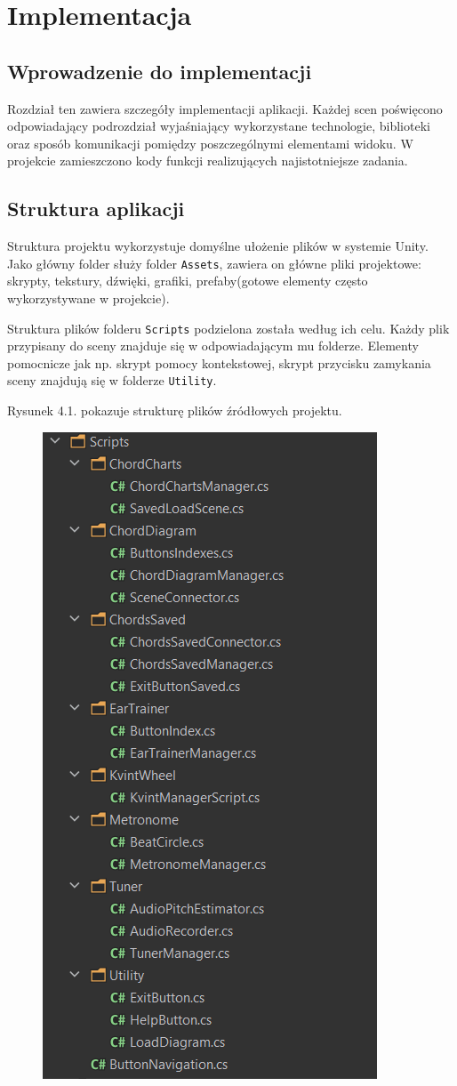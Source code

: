 \chapter{Implementacja}

\section{Wprowadzenie do implementacji}


Rozdział ten zawiera szczegóły implementacji aplikacji. Każdej scen poświęcono odpowiadający podrozdział wyjaśniający wykorzystane technologie, biblioteki oraz sposób komunikacji pomiędzy poszczególnymi elementami widoku. W projekcie zamieszczono kody funkcji realizujących najistotniejsze zadania.

\section{Struktura aplikacji}
Struktura projektu wykorzystuje domyślne ułożenie plików w systemie Unity. Jako główny folder służy folder \texttt{Assets}, zawiera on główne pliki projektowe: skrypty, tekstury, dźwięki, grafiki, prefaby(gotowe elementy często wykorzystywane w projekcie).

Struktura plików folderu \texttt{Scripts} podzielona została według ich celu. Każdy plik przypisany do sceny znajduje się w odpowiadającym mu folderze. Elementy pomocnicze jak np. skrypt pomocy kontekstowej, skrypt przycisku zamykania sceny znajdują się w folderze \texttt{Utility}.

Rysunek 4.1. pokazuje strukturę plików źródłowych projektu.
\begin{figure}[htb]
    \centering
	\includegraphics[width=0.45\linewidth]{rys04/StrukturaPlikow}
\end{figure}

